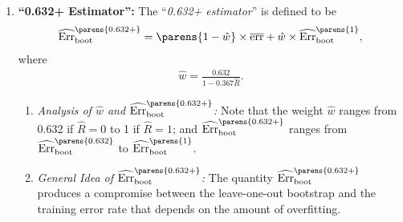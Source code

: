 \documentclass[12pt]{article}
\begin{document}
\begin{enumerate}[label=\textbf{\arabic*.}]
	\item \textbf{``0.632+ Estimator'':} The ``\textit{0.632+ estimator}'' is defined to be 
	\begin{align}
		\widehat{\mathrm{Err}}_{\mathrm{boot}}^{\parens{0.632+}} = \parens{1 - \hat{w}} \times \overline{\mathrm{err}} + \hat{w} \times \widehat{\mathrm{Err}}_{\mathrm{boot}}^{\parens{1}}, 
	\end{align}
	where 
	\begin{align*}
		\hat{w} = \frac{0.632}{1 - 0.367 \widehat{R}}. 
	\end{align*}

	\begin{enumerate}
		\item \textit{Analysis of $\hat{w}$ and $\widehat{\mathrm{Err}}_{\mathrm{boot}}^{\parens{0.632+}}$:} Note that the weight $\hat{w}$ ranges from 0.632 if $\widehat{R} = 0$ to 1 if $\widehat{R} = 1$; and $\widehat{\mathrm{Err}}_{\mathrm{boot}}^{\parens{0.632+}}$ ranges from $\widehat{\mathrm{Err}}_{\mathrm{boot}}^{\parens{0.632}}$ to $\widehat{\mathrm{Err}}_{\mathrm{boot}}^{\parens{1}}$. 
		\item \textit{General Idea of $\widehat{\mathrm{Err}}_{\mathrm{boot}}^{\parens{0.632+}}$:} The quantity $\widehat{\mathrm{Err}}_{\mathrm{boot}}^{\parens{0.632+}}$ produces a compromise between the leave-one-out bootstrap and the training error rate that depends on the amount of overfitting. 
	\end{enumerate}
	
\end{enumerate}

\printbibliography
\end{document}
